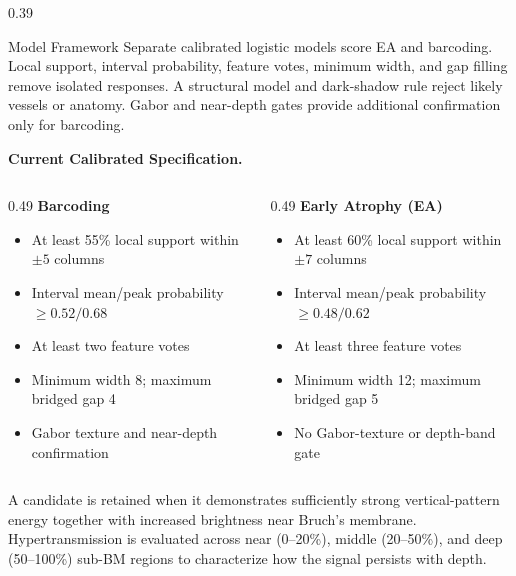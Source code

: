 \documentclass[final]{beamer}
\begin{document}
\begin{frame}[t]
\begin{columns}[t,totalwidth=\dimexpr\paperwidth-4cm\relax]
\begin{column}{0.39\textwidth}
\begin{block}{Model Framework}
    \vspace{0.35cm}
    \justifying
    Separate calibrated logistic models score EA and barcoding. Local support,
    interval probability, feature votes, minimum width, and gap filling remove
    isolated responses. A structural model and dark-shadow rule reject likely
    vessels or anatomy. Gabor and near-depth gates provide additional
    confirmation only for barcoding.

    \vspace{0.35cm}
    \textbf{Current Calibrated Specification.}
    {%
    \begin{columns}[t,totalwidth=\linewidth]
      \begin{column}{0.49\linewidth}
        \textcolor{BarcodeRed}{\textbf{Barcoding}}
        \begin{itemize}
          \item At least 55\% local support within $\pm5$ columns
          \item Interval mean/peak probability $\geq0.52/0.68$
          \item At least two feature votes
          \item Minimum width 8; maximum bridged gap 4
          \item Gabor texture and near-depth confirmation
        \end{itemize}
      \end{column}
      \begin{column}{0.49\linewidth}
        \textcolor{EAOrange}{\textbf{Early Atrophy (EA)}}
        \begin{itemize}
          \item At least 60\% local support within $\pm7$ columns
          \item Interval mean/peak probability $\geq0.48/0.62$
          \item At least three feature votes
          \item Minimum width 12; maximum bridged gap 5
          \item No Gabor-texture or depth-band gate
        \end{itemize}
      \end{column}
    \end{columns}
    }
    \vspace{1.0cm}
    \justifying
    A candidate is retained when it demonstrates sufficiently strong
    vertical-pattern energy together with increased brightness near Bruch's
    membrane. Hypertransmission is evaluated across near (0--20\%), middle
    (20--50\%), and deep (50--100\%) sub-BM regions to characterize how the
    signal persists with depth. 
  \end{block}


\end{column}
\end{columns}
\end{frame}
\end{document}
